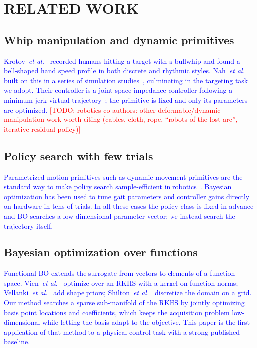 \documentclass[letterpaper, 10 pt, conference]{ieeeconf}
\newcommand{\todo}[1]{\textcolor{red}{[TODO: #1]}}
\newcommand{\draft}[1]{\textcolor{blue}{#1}}
\begin{document}
\section{RELATED WORK}

\subsection{Whip manipulation and dynamic primitives}
\draft{
Krotov~\emph{et al.}~\cite{krotov2022whip} recorded humans hitting a target
with a bullwhip and found a bell-shaped hand speed profile in both discrete and
rhythmic styles. Nah~\emph{et al.} built on this in a series of simulation
studies~\cite{nah2020whip,nah2021whip,nah2023whip}, culminating in the
targeting task we adopt. Their controller is a joint-space impedance controller
\cite{hogan1985impedance} following a minimum-jerk virtual
trajectory~\cite{flash1985minjerk}; the primitive is fixed and only its
parameters are optimized.
}
\todo{robotics co-authors: other deformable/dynamic manipulation work worth citing
(cables, cloth, rope, ``robots of the lost arc'', iterative residual policy)}

\subsection{Policy search with few trials}
\draft{
Parametrized motion primitives such as dynamic movement primitives
\cite{ijspeert2013dmp} are the standard way to make policy search
sample-efficient in robotics~\cite{kober2011policysearch,chatzilygeroudis2020survey}.
Bayesian optimization has been used to tune gait parameters
\cite{calandra2016gaits} and controller gains directly on hardware in tens of
trials. In all these cases the policy class is fixed in advance and BO searches a
low-dimensional parameter vector; we instead search the trajectory itself.
}

\subsection{Bayesian optimization over functions}
\draft{
Functional BO extends the surrogate from vectors to elements of a function
space. Vien~\emph{et al.}~\cite{vien2018fbo} optimize over an RKHS with a
kernel on function norms; Vellanki~\emph{et al.}~\cite{vellanki2019fbo} add
shape priors; Shilton~\emph{et al.}~\cite{shilton2020fbo} discretize the
domain on a grid. Our method \cite{ours2026fbo} searches a sparse sub-manifold
of the RKHS by jointly optimizing basis point locations and coefficients, which
keeps the acquisition problem low-dimensional while letting the basis adapt to
the objective. This paper is the first application of that method to a
physical control task with a strong published baseline.
}
\end{document}
